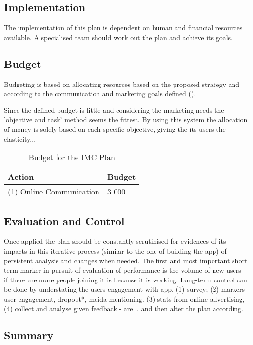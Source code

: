 \documentclass[12pt]{article}
\begin{document}
\subsection{Implementation}
The implementation of this plan is dependent on human and financial resources available. A specialised team should work out the plan and achieve its goals.

\subsection{Budget}

Budgeting is based on allocating resources based on the proposed strategy and according to the communication and marketing goals defined (\cite{clow}). 

Since the defined budget is little and considering the marketing needs the 'objective and task' method seems the fittest. By using this system the allocation of money is solely based on each specific objective, giving the its users the elasticity...

\begin{table}[htb]
\small
\caption{Budget for the IMC Plan}
\label{table:budget}
\centering
\begin{tabular}{ @{}P{0.5\textwidth}P{0.2\textwidth}@{} }
Action	&	Budget	\\ \hline
 (1) Online Communication	&	3 000  \\
\end{tabular}
\end{table}


\subsection{Evaluation and Control}

Once applied the plan should be constantly scrutinised for evidences of its impacts in this iterative process (similar to the one of building the app) of persistent analysis and changes when needed. The first and most important short term marker in pursuit of evaluation of performance is the volume of new users - if there are more people joining it is because it is working. Long-term control can be done by understating the users engagement with app. (1) survey; (2) markers - user engagement, dropout*, meida mentioning,  (3) stats from online advertising, (4) collect and analyse given feedback - are .. and then alter the plan according.


\subsection{Summary}
\end{document}
